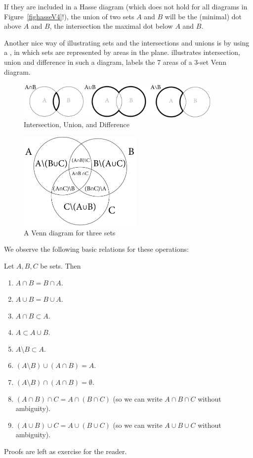 If they are included in a Hasse diagram (which does not hold for all
diagrams in Figure~\ref{fighasseV4}!), the union of two sets $A$ and $B$
will be the (minimal) dot above $A$ and $B$, the intersection the maximal
dot below $A$ and $B$. 
\medskip

Another nice way of illustrating sets and the intersections and unions
is by using a , in which sets are represented by areas in the plane.
 illustrates intersection, union and difference in
such a diagram,  labels the 7 areas of a 3-set Venn
diagram.

\begin{figure}[t]
\begin{center}
\includegraphics[width=10cm]{pic/VennMulti.pdf}
\end{center}
\caption{Intersection, Union, and Difference}
\label{figvennmulti}
\end{figure}

\begin{figure}[t]
\begin{center}
\includegraphics[width=6cm]{pic/VennDiagram.pdf}
\end{center}
\caption{A Venn diagram for three sets}
\label{figvenndiag}
\end{figure}

We observe the following basic relations for these operations:
\begin{lemma}
Let $A,B,C$ be sets. Then
\begin{enumerate}
\item $A\cap B=B\cap A$.
\item $A\cup B=B\cup A$.
\item $A\cap B\subset A$.
\item $A\subset A\cup B$.
\item $A\setminus B\subset A$.
\item $(A\setminus B)\cup (A\cap B)=A$.
\item $(A\setminus B)\cap (A\cap B)=\emptyset$.
\item $(A\cap B)\cap C=A\cap (B\cap C)$ (so we can write $A\cap B\cap C$
without ambiguity).
\item $(A\cup B)\cup C=A\cup (B\cup C)$ (so we can write $A\cup B\cup C$
without ambiguity).
\end{enumerate}
\end{lemma}
Proofs are left as exercise for the reader.

